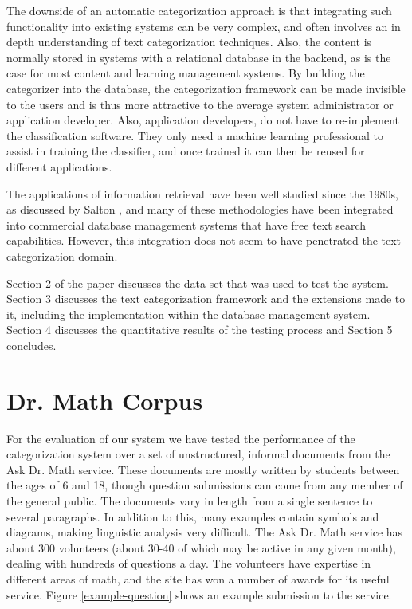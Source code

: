 \documentclass{article}
\begin{document}
The downside of an automatic categorization approach is that integrating such 
functionality into existing systems can be very complex, and often involves an in 
depth understanding of text categorization techniques.  Also, the content is normally 
stored in systems with a relational database in the backend, as is the case for most 
content and learning management systems. By building the categorizer into the 
database, the categorization framework\cite{williams:02} can be made invisible to the 
users and is thus more attractive to the average system administrator or application 
developer. Also, application developers, do not have to re-implement the 
classification software. They only need a machine learning professional to assist in 
training the classifier, and once trained it can then be reused for different applications. 

The applications of information retrieval have been well studied since the 1980s, as 
discussed by Salton \cite{salton:89,salton:91}, and many of these methodologies have been 
integrated into commercial database management systems that have free text search 
capabilities. However, this integration does not seem to have penetrated the text 
categorization domain.

Section 2 of the paper discusses the data set that was used to test
the system. Section 3 discusses the text categorization framework and
the extensions made to it, including the implementation within the
database management system. Section 4 discusses the quantitative
results of the testing process and Section 5 concludes.

\section{Dr. Math Corpus}
\label{corpus}

For the evaluation of our system we have tested the performance of the
categorization system over a set of unstructured, informal documents
from the Ask Dr. Math service.\cite{drmath} These documents are mostly
written by students between the ages of 6 and 18, though question
submissions can come from any member of the general public.  The documents vary
in length from a single sentence to several paragraphs. In addition to
this, many examples contain symbols and diagrams, making linguistic
analysis very difficult. The Ask Dr. Math service has about 300
volunteers (about 30-40 of which may be active in any given month),
dealing with hundreds of questions a day. The volunteers have
expertise in different areas of math, and the site has won a number of
awards for its useful service.  Figure \ref{example-question} shows an
example submission to the service.
\end{document}
